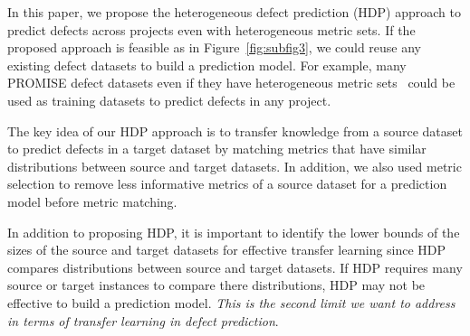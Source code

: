 % 





In this paper, we propose the heterogeneous defect prediction (HDP) approach
to predict defects across projects even with heterogeneous metric
sets.
If the proposed approach is feasible as in
Figure~\ref{fig:subfig3}, we could reuse any existing defect
datasets to build a prediction model. For example, many PROMISE defect datasets
even if they have heterogeneous metric sets~\cite{promise12} could be used as
training datasets to predict defects in any project.

The key idea of our HDP approach is to transfer knowledge from a source dataset to predict defects in a target dataset by matching metrics that have
similar distributions between source and target datasets. In addition, we also
used metric selection to remove less informative metrics of a source dataset
for a prediction model before metric matching.

In addition to proposing HDP, it is important to identify the lower bounds of the sizes of the source and target datasets for effective transfer learning since HDP compares distributions between source and target datasets. 
If HDP requires many source or target instances to compare there distributions, HDP may not be effective to build a prediction model. {\em This is the second limit we want to address in terms of transfer learning in defect prediction}.


